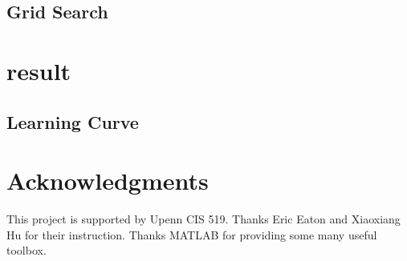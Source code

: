 \documentclass{article}
\begin{document}
\subsection{Grid Search}

\section{result}
\subsection{Learning Curve}



\section*{Acknowledgments}
This project is supported by Upenn CIS 519. Thanks Eric Eaton and Xiaoxiang Hu for their instruction. Thanks MATLAB for providing some many useful toolbox.



\end{document}
